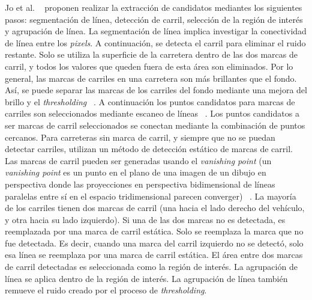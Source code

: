 Jo et al. ~ proponen realizar la extracción de candidatos mediantes los siguientes pasos: segmentación
de línea, detección de carril, selección de la región de interés y agrupación de línea. La segmentación de línea implica investigar la conectividad 
de línea entre los \emph{pixels}. A continuación, se detecta el carril para eliminar el ruido restante. Solo se utiliza la superficie de la carretera dentro de las dos marcas de 
carril, y todos los valores que queden fuera de esta área son eliminados. Por lo general, las marcas de carriles en una carretera son más brillantes que el fondo.
Así, se puede separar las marcas de los carriles del fondo mediante una  mejora del brillo y el \emph{thresholding} ~. A continuación los 
puntos candidatos para marcas de carriles son seleccionados mediante escaneo de líneas ~. Los puntos candidatos a ser marcas de carril 
seleccionados se conectan mediante la combinación de puntos cercanos. Para carreteras sin marca de carril, y siempre que no se puedan detectar carriles, utilizan 
un método de detección estático de marcas de carril. Las marcas de carril pueden ser generadas usando el \emph{vanishing point} (un \emph{vanishing point} es un punto 
en el plano de una imagen de un dibujo en perspectiva donde las proyecciones en perspectiva bidimensional de líneas paralelas entre sí en el espacio 
tridimensional parecen converger) ~. La mayoría de los carriles tienen dos marcas de carril (una hacia el lado derecho 
del vehículo, y otra hacia su lado izquierdo). Si una de las dos marcas no es detectada, es reemplazada por una marca de carril estática. Solo 
se reemplaza la marca que no fue detectada. Es decir, cuando una marca del carril izquierdo no se detectó, solo esa línea se reemplaza por una marca 
de carril estática. El área entre dos marcas de carril detectadas es seleccionada como la región de interés. La agrupación 
de línea se aplica dentro de la región de interés. La agrupación de línea también remueve el ruido creado por el proceso de \emph{thresholding}.

